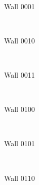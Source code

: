 \documentclass[11pt,a4paper,notitlepage]{report}
\newenvironment{img}{
	\begin{center}
		\begin{figure}[H]
			\begin{center}
			
}{
	\end{center}
		\end{figure}
			\end{center}
}
\begin{document}
				\begin{img}
					\\
					\caption{Wall 0001}
				\end{img}
				\begin{img}
					\\
					\caption{Wall 0010}
				\end{img}
				\begin{img}
					\\
					\caption{Wall 0011}
				\end{img}
				\begin{img}
					\\
					\caption{Wall 0100}
				\end{img}
				\begin{img}
					\\
					\caption{Wall 0101}
				\end{img}
				\begin{img}
					\\
					\caption{Wall 0110}
				\end{img}
\end{document}
